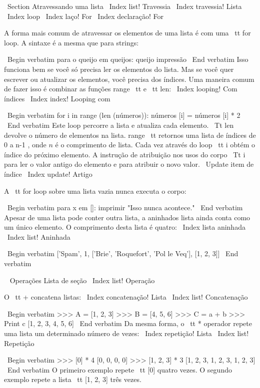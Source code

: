 \documentclass[10pt]{book}
\begin{document}
\begin {itemize}
{{{{{{\ Section {Atravessando uma lista}
\ Index {list! Travessia}
\ Index {travessia! Lista}
\ Index {loop}
\ Index {laço! For}
\ Index {declaração! For}

A forma mais comum de atravessar os elementos de uma lista é
com uma {\ tt for} loop. A sintaxe é a mesma que para strings:

\ Begin {verbatim}
para o queijo em queijos:
    queijo impressão
\ End {verbatim}
%
Isso funciona bem se você só precisa ler os elementos do
lista. Mas se você quer escrever ou atualizar os elementos, você
precisa dos índices. Uma maneira comum de fazer isso é combinar
as funções {range \ tt} e {\ tt len}:
\ Index {looping! Com índices}
\ Index {index! Looping com}

\ Begin {verbatim}
for i in range (len (números)):
    números [i] = números [i] * 2
\ End {verbatim}
%
Este loop percorre a lista e atualiza cada elemento. {\ Tt len}
devolve o número de elementos na lista. {range \ tt} retornos
uma lista de índices de 0 a n-1 $ $, onde $ n $ é o comprimento de
lista. Cada vez através do loop {\ tt i} obtém o índice
do próximo elemento. A instrução de atribuição nos usos do corpo
{\ Tt i} para ler o valor antigo do elemento e para atribuir o
novo valor.
\ {Update} item de índice
\ Index {update! Artigo}

A {\ tt for} loop sobre uma lista vazia nunca executa o corpo:

\ Begin {verbatim}
para x em []:
    imprimir "Isso nunca acontece."
\ End {verbatim}
%
Apesar de uma lista pode conter outra lista, a aninhados
lista ainda conta como um único elemento. O comprimento desta lista é
quatro:
\ Index {lista aninhada}
\ Index {list! Aninhada}

\ Begin {verbatim}
['Spam', 1, ['Brie', 'Roquefort', 'Pol le Veq'], [1, 2, 3]]
\ End {verbatim}



\ {} Operações Lista de seção
\ Index {list! Operação}

O {\ tt +} concatena listas:
\ Index {concatenação! Lista}
\ Index {list! Concatenação}

\ Begin {verbatim}
>>> A = [1, 2, 3]
>>> B = [4, 5, 6]
>>> C = a + b
>>> Print c
[1, 2, 3, 4, 5, 6]
\ End {verbatim}
%
Da mesma forma, o {\ tt *} operador repete uma lista um determinado número de vezes:
\ Index {repetição! Lista}
\ Index {list! Repetição}

\ Begin {verbatim}
>>> [0] * 4
[0, 0, 0, 0]
>>> [1, 2, 3] * 3
[1, 2, 3, 1, 2, 3, 1, 2, 3]
\ End {verbatim}
%
O primeiro exemplo repete {\ tt [0]} quatro vezes. O segundo exemplo
repete a lista {\ tt [1, 2, 3]} três vezes.


}}}}}}
\end{itemize}
\end{document}
